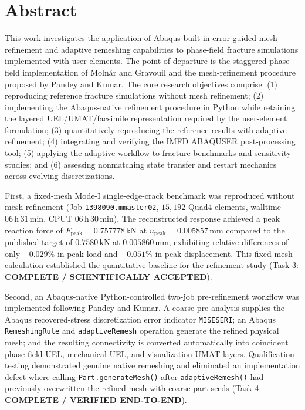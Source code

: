 \chapter*{Abstract}

This work investigates the application of Abaqus built-in error-guided mesh refinement and adaptive remeshing capabilities to phase-field fracture simulations implemented with user elements. The point of departure is the staggered phase-field implementation of Moln\'ar and Gravouil and the mesh-refinement procedure proposed by Pandey and Kumar. The core research objectives comprise: (1) reproducing reference fracture simulations without mesh refinement; (2) implementing the Abaqus-native refinement procedure in Python while retaining the layered UEL/UMAT/facsimile representation required by the user-element formulation; (3) quantitatively reproducing the reference results with adaptive refinement; (4) integrating and verifying the IMFD ABAQUSER post-processing tool; (5) applying the adaptive workflow to fracture benchmarks and sensitivity studies; and (6) assessing nonmatching state transfer and restart mechanics across evolving discretizations.

First, a fixed-mesh Mode-I single-edge-crack benchmark was reproduced without mesh refinement (Job \texttt{1398090.mmaster02}, $15{,}192$ Quad4 elements, walltime $06\,\mathrm{h}\,31\,\mathrm{min}$, CPUT $06\,\mathrm{h}\,30\,\mathrm{min}$). The reconstructed response achieved a peak reaction force of $F_{\text{peak}} = 0.757778\,\mathrm{kN}$ at $u_{\text{peak}} = 0.005857\,\mathrm{mm}$ compared to the published target of $0.7580\,\mathrm{kN}$ at $0.005860\,\mathrm{mm}$, exhibiting relative differences of only $-0.029\%$ in peak load and $-0.051\%$ in peak displacement. This fixed-mesh calculation established the quantitative baseline for the refinement study (Task 3: \textbf{COMPLETE / SCIENTIFICALLY ACCEPTED}).

Second, an Abaqus-native Python-controlled two-job pre-refinement workflow was implemented following Pandey and Kumar. A coarse pre-analysis supplies the Abaqus recovered-stress discretization error indicator \texttt{MISESERI}; an Abaqus \texttt{RemeshingRule} and \texttt{adaptiveRemesh} operation generate the refined physical mesh; and the resulting connectivity is converted automatically into coincident phase-field UEL, mechanical UEL, and visualization UMAT layers. Qualification testing demonstrated genuine native remeshing and eliminated an implementation defect where calling \texttt{Part.generateMesh()} after \texttt{adaptiveRemesh()} had previously overwritten the refined mesh with coarse part seeds (Task 4: \textbf{COMPLETE / VERIFIED END-TO-END}).

